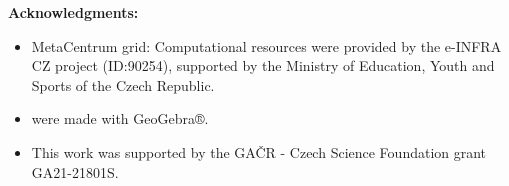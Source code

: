 

\def\bibfont{\hfuzz=2pt}

\printbibliography[heading=bibintoc]
\vspace{1em}
\noindent \textbf{Acknowledgments:}
\begin{itemize}[nosep]
	\item MetaCentrum grid: Computational resources were provided by the e-INFRA CZ project (ID:90254), supported by the Ministry of Education, Youth and Sports of the Czech Republic.
	\item {} were made with GeoGebra®.
	\item This work was supported by the GAČR - Czech Science Foundation grant GA21-21801S.
\end{itemize}



